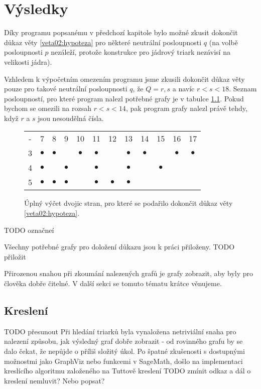 
\chapter{Výsledky}

Díky programu popsanému v předchozí kapitole bylo možné zkusit dokončit důkaz věty \eqref{veta02:hypoteza} pro některé neutrální posloupnosti $q$ (na volbě posloupnosti $p$ nezáleží, protože konstrukce pro jádrový triark nezávisí na velikosti jádra). 

Vzhledem k výpočetním omezením programu jsme zkusili dokončit důkaz věty pouze pro takové neutrální posloupnosti $q$, že $Q = {r, s}$ a navíc $r<s<18$. Seznam posloupností, pro které program nalezl potřebné grafy je v tabulce \ref{obr03:tabvysledky}. Pokud bychom se omezili na rozsah $r<s<14$, pak program grafy nalezl právě tehdy, když $r$ a $s$ jsou nesoudělná čísla.

\begin{figure}[h]\centering
\begin{tabular}{ c c c c c c c c c c c c }
  - & 7 & 8 & 9 & 10 & 11 & 12 & 13 & 14 & 15 & 16 & 17 \\
  3 & $\bullet$ & $\bullet$ &  & $\bullet$ & $\bullet$ &  & $\bullet$ & $\bullet$ &  & $\bullet$ & $\bullet$ \\
  4 & $\bullet$ &  & $\bullet$ &  & $\bullet$ &  & $\bullet$ &  & $\bullet$ \\
  5 & $\bullet$ & $\bullet$ & $\bullet$ &  & $\bullet$ & $\bullet$ & $\bullet$  
\end{tabular}
\caption{Úplný výčet dvojic stran, pro které se podařilo dokončit důkaz věty \eqref{veta02:hypoteza}.}
\label{obr03:tabvysledky}
\end{figure}
TODO označneí

Všechny potřebné grafy pro doložení důkazu jsou k práci přiloženy. TODO přiložit

Přirozenou snahou při zkoumání nalezených grafů je grafy zobrazit, aby byly pro člověka dobře čitelné. V další sekci se tomuto tématu krátce věnujeme. 

\section{Kreslení}

TODO přesunout
Při hledání triarků byla vynaložena netriviální snaha pro nalezení způsobu, jak výsledný graf dobře zobrazit - od rovinného grafu by se dalo čekat, že nepůjde o příliš složitý úkol. Po špatné zkušenosti s dostupnými možnostmi jako GraphViz nebo funkcemi v SageMath, došlo na implementaci kreslícího algoritmu založeného na Tuttově kreslení TODO zmínit odkaz a dál o kreslení nemluvit? Nebo popsat? 
